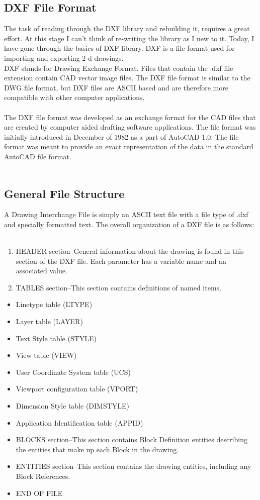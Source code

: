 \subsection{DXF File Format}
The task of reading through the DXF library and rebuilding it, requires a great effort. At this stage I can’t think of re-writing the library as I new to it. Today, I have gone through the basics of DXF library. DXF is a file format used for importing and exporting 2-d drawings.\\
DXF stands for Drawing Exchange Format. Files that contain the .dxf file extension contain CAD vector image files. The DXF file format is similar to the DWG file format, but DXF files are ASCII based and are therefore more compatible with other computer applications.\\\\
The DXF file format was developed as an exchange format for the CAD files that are created by computer aided drafting software applications. The file format was initially introduced in December of 1982 as a part of AutoCAD 1.0. The file format was meant to provide an exact representation of the data in the standard AutoCAD file format.\\\\
\subsection{General File Structure}
A Drawing Interchange File is simply an ASCII text file with a file type of .dxf and specially formatted text. The overall organization of a DXF file is as follows:\\\\
\begin{enumerate}
\item HEADER section–General information about the drawing is found in this section of the DXF file. Each parameter has a variable name and an associated value.
\item TABLES section–This section contains definitions of named items.
\end{enumerate}

\begin{itemize}
\item Linetype table (LTYPE)
\item Layer table (LAYER)
\item Text Style table (STYLE)
\item View table (VIEW)
\item User Coordinate System table (UCS)
\item Viewport configuration table (VPORT)
\item Dimension Style table (DIMSTYLE)
\item Application Identification table (APPID)
\item BLOCKS section–This section contains Block Definition entities describing the entities that make up each Block in the drawing.
\item ENTITIES section–This section contains the drawing entities, including any Block References.
\item END OF FILE
\end{itemize}

